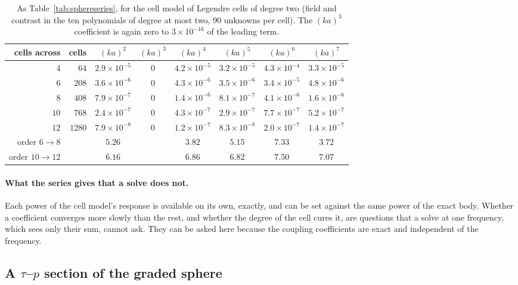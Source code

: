 \documentclass[11pt,a4paper]{article}
\begin{document}
\begin{table}[h]
\centering
\small
\begin{tabular}{rrcccccc}
\toprule
cells across & cells & $(ka)^2$ & $(ka)^3$ & $(ka)^4$ & $(ka)^5$ & $(ka)^6$ & $(ka)^7$ \\
\midrule
$4$  & $64$   & $2.9\times10^{-5}$ & $0$ & $4.2\times10^{-5}$ & $3.2\times10^{-5}$ & $4.3\times10^{-4}$ & $3.3\times10^{-5}$ \\
$6$  & $208$  & $3.6\times10^{-6}$ & $0$ & $4.3\times10^{-6}$ & $3.5\times10^{-6}$ & $3.4\times10^{-5}$ & $4.8\times10^{-6}$ \\
$8$  & $408$  & $7.9\times10^{-7}$ & $0$ & $1.4\times10^{-6}$ & $8.1\times10^{-7}$ & $4.1\times10^{-6}$ & $1.6\times10^{-6}$ \\
$10$ & $768$  & $2.4\times10^{-7}$ & $0$ & $4.3\times10^{-7}$ & $2.9\times10^{-7}$ & $7.7\times10^{-7}$ & $5.2\times10^{-7}$ \\
$12$ & $1280$ & $7.9\times10^{-8}$ & $0$ & $1.2\times10^{-7}$ & $8.3\times10^{-8}$ & $2.0\times10^{-7}$ & $1.4\times10^{-7}$ \\
\midrule
order $6\to8$   & & $5.26$ & & $3.82$ & $5.15$ & $7.33$ & $3.72$ \\
order $10\to12$ & & $6.16$ & & $6.86$ & $6.82$ & $7.50$ & $7.07$ \\
\bottomrule
\end{tabular}
\caption{As Table~\ref{tab:sphereseries}, for the cell model of Legendre cells of degree two (field and
contrast in the ten polynomials of degree at most two, $90$ unknowns per cell). The $(ka)^3$ coefficient is
again zero to $3\times10^{-16}$ of the leading term.}
\label{tab:sphereseriesquad}
\end{table}

\paragraph{What the series gives that a solve does not.} Each power of the cell model's response is
available on its own, exactly, and can be set against the same power of the exact body. Whether a
coefficient converges more slowly than the rest, and whether the degree of the cell cures it, are questions
that a solve at one frequency, which sees only their sum, cannot ask. They can be asked here because the
coupling coefficients are exact and independent of the frequency.

\subsection{A \texorpdfstring{$\tau$--$p$}{tau-p} section of the graded sphere}\label{sec:taup}
\end{document}
